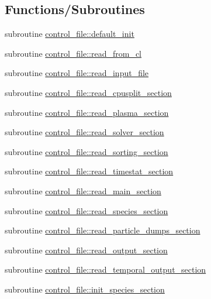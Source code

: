 \subsection*{Functions/\+Subroutines}
\begin{DoxyCompactItemize}
\item 
subroutine \hyperlink{namespacecontrol__file_a80a60361388cc26b8fe06e18e81dc50a}{control\+\_\+file\+::default\+\_\+init}
\item 
subroutine \hyperlink{namespacecontrol__file_afa9aa95463bcdfe5197ba2ac94793e9f}{control\+\_\+file\+::read\+\_\+from\+\_\+cl}
\item 
subroutine \hyperlink{namespacecontrol__file_a12ed3f461d585d4199bd6d079a5d74c3}{control\+\_\+file\+::read\+\_\+input\+\_\+file}
\item 
subroutine \hyperlink{namespacecontrol__file_a488db4847d7ab565187470e915cfcb81}{control\+\_\+file\+::read\+\_\+cpusplit\+\_\+section}
\item 
subroutine \hyperlink{namespacecontrol__file_ac9b9d61786de32de87c8ddee39a0ac8c}{control\+\_\+file\+::read\+\_\+plasma\+\_\+section}
\item 
subroutine \hyperlink{namespacecontrol__file_ac65dc6ab5ac3863b22d480b2f9ce1b3b}{control\+\_\+file\+::read\+\_\+solver\+\_\+section}
\item 
subroutine \hyperlink{namespacecontrol__file_a76aeb0fb2e335ba8495d28bbca1bd6e4}{control\+\_\+file\+::read\+\_\+sorting\+\_\+section}
\item 
subroutine \hyperlink{namespacecontrol__file_af10502f8b6dd7152860ce78ddc0f4ff3}{control\+\_\+file\+::read\+\_\+timestat\+\_\+section}
\item 
subroutine \hyperlink{namespacecontrol__file_a88006372b7d91fbde08778111f02fd97}{control\+\_\+file\+::read\+\_\+main\+\_\+section}
\item 
subroutine \hyperlink{namespacecontrol__file_a76b277dd7c336fdc4ff255f1f1e23365}{control\+\_\+file\+::read\+\_\+species\+\_\+section}
\item 
subroutine \hyperlink{namespacecontrol__file_abe9d14779d86f200329241b34ba94b33}{control\+\_\+file\+::read\+\_\+particle\+\_\+dumps\+\_\+section}
\item 
subroutine \hyperlink{namespacecontrol__file_a8beaa20ec4cf16cbc533182a9500f5a3}{control\+\_\+file\+::read\+\_\+output\+\_\+section}
\item 
subroutine \hyperlink{namespacecontrol__file_a37549c37c459c5e8ffa18cb84a7116f8}{control\+\_\+file\+::read\+\_\+temporal\+\_\+output\+\_\+section}
\item 
subroutine \hyperlink{namespacecontrol__file_a1cd090a937bb673f043a85221c21f8a7}{control\+\_\+file\+::init\+\_\+species\+\_\+section}
\end{DoxyCompactItemize}
